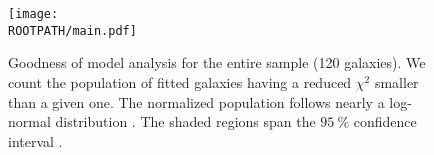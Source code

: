 \begin{figure}%
	\centering%
	\texttt{[image: \\ROOTPATH/main.pdf]}%
	\caption{Goodness of model analysis for the entire sample (120 galaxies). We count the population of fitted galaxies having a reduced $\chi^2$ smaller than a given one. The normalized population  follows nearly a log-normal distribution . The shaded regions span the $\SI{95}{\percent}$ confidence interval .}%
	\label{fig:goodness:all}
\end{figure}